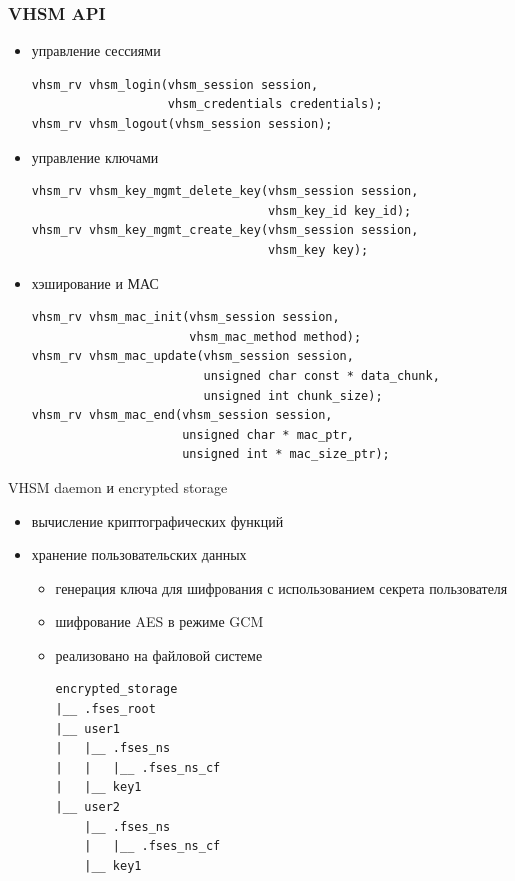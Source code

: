 \documentclass[utf8, 11pt]{beamer}
\begin{document}
\begin{frame}[fragile]
\frametitle{VHSM API}

\lstset{language=C++, basicstyle=\ttfamily\scriptsize}
\begin{itemize}
\item управление сессиями
\begin{lstlisting}
vhsm_rv vhsm_login(vhsm_session session,
                   vhsm_credentials credentials);
vhsm_rv vhsm_logout(vhsm_session session);
\end{lstlisting}

\item управление ключами
\begin{lstlisting}
vhsm_rv vhsm_key_mgmt_delete_key(vhsm_session session,
                                 vhsm_key_id key_id);
vhsm_rv vhsm_key_mgmt_create_key(vhsm_session session,
                                 vhsm_key key);
\end{lstlisting}

\item хэширование и МАС
\begin{lstlisting}
vhsm_rv vhsm_mac_init(vhsm_session session,
                      vhsm_mac_method method);
vhsm_rv vhsm_mac_update(vhsm_session session,
                        unsigned char const * data_chunk,
                        unsigned int chunk_size);
vhsm_rv vhsm_mac_end(vhsm_session session,
                     unsigned char * mac_ptr,
                     unsigned int * mac_size_ptr);
\end{lstlisting}
\end{itemize}
\end{frame}

\begin{frame}[fragile]{VHSM daemon и encrypted storage}

\begin{itemize}
\item вычисление криптографических функций
\item хранение пользовательских данных
	\begin{itemize}
	\item генерация ключа для шифрования с использованием секрета пользователя
	\item шифрование AES в режиме GCM
	\item реализовано на файловой системе
\begin{lstlisting}
encrypted_storage
|__ .fses_root
|__ user1
|   |__ .fses_ns
|   |   |__ .fses_ns_cf
|   |__ key1
|__ user2
    |__ .fses_ns
    |   |__ .fses_ns_cf
    |__ key1
\end{lstlisting}
	\end{itemize}
\end{itemize}
\end{frame}
\end{document}
